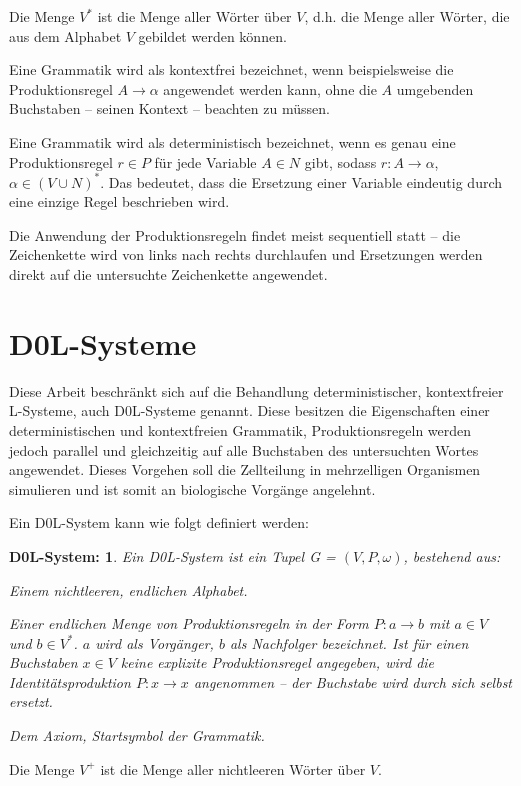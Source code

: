 Die Menge $V^*$ ist die Menge aller Wörter über $V$, d.h. die Menge aller Wörter, die aus dem Alphabet $V$ gebildet werden können. \cite[S.70]{ThI:14} 

Eine Grammatik wird als kontextfrei bezeichnet, wenn beispielsweise die Produktionsregel $A \rightarrow \alpha$ angewendet werden kann, ohne die $A$ umgebenden Buchstaben -- seinen Kontext -- beachten zu müssen. \cite[S.343]{ThI:14} 

Eine Grammatik wird als deterministisch bezeichnet, wenn es genau eine Produktionsregel $r \in P$ für jede Variable $A \in N$ gibt, sodass $r: A \rightarrow \alpha$, $\alpha \in (V \cup N )^*$. Das bedeutet, dass die Ersetzung einer Variable eindeutig durch eine einzige Regel beschrieben wird. \cite[S.75]{PCGiG:16}

Die Anwendung der Produktionsregeln findet meist sequentiell statt -- die Zeichenkette wird von links nach rechts durchlaufen und Ersetzungen werden direkt auf die untersuchte Zeichenkette angewendet. \cite[S.75]{PCGiG:16}

\section{D0L-Systeme}

Diese Arbeit beschränkt sich auf die Behandlung deterministischer, kontextfreier L-Systeme, auch D0L-Systeme genannt. Diese besitzen die Eigenschaften einer deterministischen und kontextfreien Grammatik, Produktionsregeln werden jedoch parallel und gleichzeitig auf alle Buchstaben des untersuchten Wortes angewendet. Dieses Vorgehen soll die Zellteilung in mehrzelligen Organismen simulieren und ist somit an biologische Vorgänge angelehnt. \cite[S. 3]{ABOP:04} 

Ein D0L-System kann wie folgt definiert werden:
\newtheorem{defD0LSystem}{D0L-System:}[chapter]
\begin{defD0LSystem}
	Ein D0L-System ist ein Tupel G = $(V, P, \omega)$, bestehend aus:
	
	\begin{description}[labelindent]
		\item[\boldmath$V$] Einem nichtleeren, endlichen Alphabet.\\
		
		\item[\boldmath$P$] Einer endlichen Menge von Produktionsregeln in der Form $P: a \rightarrow b$ mit $a \in V$ und $b \in V^*$. $a$ wird als Vorgänger, $b$ als Nachfolger bezeichnet. Ist für einen Buchstaben $x \in V$ keine explizite Produktionsregel angegeben, wird die Identitätsproduktion $P: x \rightarrow x$ angenommen -- der Buchstabe wird durch sich selbst ersetzt.\\
		
		\item[\boldmath$\omega \in V^+$]  Dem Axiom, Startsymbol der Grammatik.		
	\end{description}
\cite[S.4]{ABOP:04} 
\end{defD0LSystem}
Die Menge $V^+$ ist die Menge aller nichtleeren Wörter über $V$. \cite[S.70]{ThI:14}


